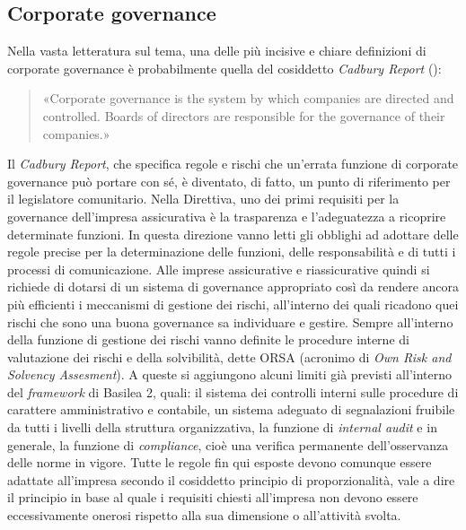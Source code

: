 \subsection{Corporate governance}
Nella vasta letteratura sul tema, una delle più incisive e chiare definizioni di corporate governance è probabilmente quella del cosiddetto {\itshape Cadbury Report} (\cite[p. 15]{cadburyreport}):
\begin{quotation}
«Corporate governance is the system by which companies are directed and
controlled. Boards of directors are responsible for the governance of their
companies.»
\end{quotation}
Il {\itshape Cadbury Report}, che specifica regole e rischi che un’errata funzione di corporate governance può portare con sé, è diventato, di fatto, un punto di riferimento per il legislatore comunitario.
Nella Direttiva, uno dei primi requisiti per la governance dell’impresa assicurativa è la trasparenza e l’adeguatezza a ricoprire determinate funzioni. In questa direzione vanno letti gli obblighi ad adottare delle regole precise per la determinazione delle funzioni,  delle responsabilità e di tutti i processi di comunicazione.
Alle imprese assicurative e riassicurative quindi si richiede di dotarsi di un sistema di governance appropriato così da rendere ancora più efficienti i meccanismi di gestione dei rischi, all’interno dei quali ricadono quei rischi che sono una buona governance sa individuare e gestire.
Sempre all’interno della funzione di gestione dei rischi vanno definite le procedure interne di valutazione dei rischi e della solvibilità, dette ORSA (acronimo di {\itshape Own Risk and Solvency Assesment}).
A queste si aggiungono alcuni limiti già previsti all’interno del {\itshape framework} di Basilea 2, quali: il sistema dei controlli interni sulle procedure di carattere amministrativo e contabile, un sistema adeguato di segnalazioni fruibile da tutti i livelli della struttura organizzativa, la funzione di {\itshape internal audit} e in generale, la funzione di {\itshape compliance}, cioè una verifica permanente dell’osservanza delle norme in vigore.
Tutte le regole fin qui esposte devono comunque essere adattate all’impresa secondo il cosiddetto principio di proporzionalità, vale a dire il principio in base al quale i requisiti chiesti all’impresa non devono essere eccessivamente onerosi rispetto alla sua dimensione o all’attività svolta.

